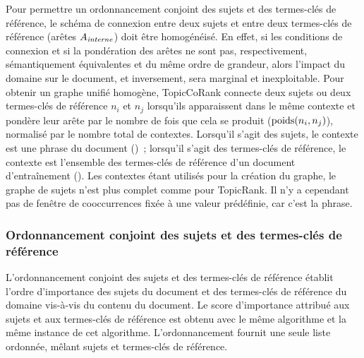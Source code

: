         Pour permettre un ordonnancement conjoint des sujets et des termes-clés
        de référence, le schéma de connexion entre deux sujets et entre deux
        termes-clés de référence (arêtes $A_\textnormal{\textit{interne}}$) doit
        être homogénéisé. En effet, si les conditions de connexion et si la
        pondération des arêtes ne sont pas, respectivement, sémantiquement
        équivalentes et du même ordre de grandeur, alors l'impact du domaine sur
        le document, et inversement, sera marginal et inexploitable. Pour
        obtenir un graphe unifié homogène, TopicCoRank connecte deux sujets ou
        deux termes-clés de référence $n_i$ et $n_j$ lorsqu'ils apparaissent
        dans le même contexte et pondère leur arête par le nombre de fois que
        cela se produit ($\textnormal{poids}(n_i, n_j)$), normalisé par le
        nombre total de contextes. Lorsqu'il s'agit des sujets, le contexte est
        une phrase du document ()~; lorsqu'il s'agit des
        termes-clés de référence, le contexte est l'ensemble des termes-clés de
        référence d'un document d'entraînement (). Les contextes
        étant utilisés pour la création du graphe, le graphe de sujets n'est
        plus complet comme pour TopicRank. Il n'y a  cependant pas de fenêtre de
        cooccurrences fixée à une valeur prédéfinie, car c'est la phrase.

      \subsubsection{Ordonnancement conjoint des sujets et des termes-clés de référence}
      \label{subsubsec:main-domain_specific_keyphrase_annotation-supervised_automatic_keyphrase_extraction-topiccorank-co_ranking}
        L'ordonnancement conjoint des sujets et des termes-clés de référence
        établit l'ordre d'importance des sujets du document et des termes-clés
        de référence du domaine vis-à-vis du contenu du document. Le score
        d'importance attribué aux sujets et aux termes-clés de référence est
        obtenu avec le même algorithme et la même instance de cet algorithme.
        L'ordonnancement fournit une seule liste ordonnée, mêlant sujets et
        termes-clés de référence.

